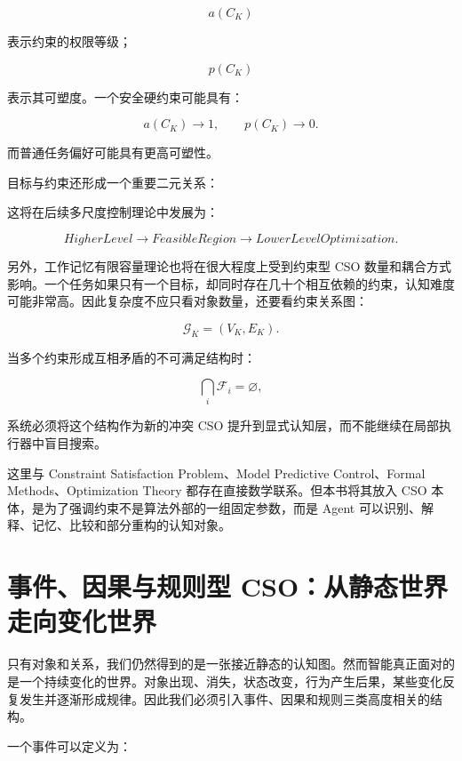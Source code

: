 \[
a(C_K)
\]

表示约束的权限等级；

\[
p(C_K)
\]

表示其可塑度。一个安全硬约束可能具有：

\[
a(C_K)\rightarrow 1,
\qquad
p(C_K)\rightarrow0.
\]

而普通任务偏好可能具有更高可塑性。

目标与约束还形成一个重要二元关系：

\begin{statementbox}
\centering
{}
\end{statementbox}

这将在后续多尺度控制理论中发展为：

\[
HigherLevel
\rightarrow
FeasibleRegion
\rightarrow
LowerLevelOptimization.
\]

另外，工作记忆有限容量理论也将在很大程度上受到约束型 CSO 数量和耦合方式影响。一个任务如果只有一个目标，却同时存在几十个相互依赖的约束，认知难度可能非常高。因此复杂度不应只看对象数量，还要看约束关系图：

\[
\mathcal G_K
=
(V_K,E_K).
\]

当多个约束形成互相矛盾的不可满足结构时：

\[
\bigcap_i \mathcal F_i
=
\varnothing,
\]

系统必须将这个结构作为新的冲突 CSO 提升到显式认知层，而不能继续在局部执行器中盲目搜索。

这里与 Constraint Satisfaction Problem、Model Predictive Control、Formal Methods、Optimization Theory 都存在直接数学联系。但本书将其放入 CSO 本体，是为了强调约束不是算法外部的一组固定参数，而是 Agent 可以识别、解释、记忆、比较和部分重构的认知对象。


\section{事件、因果与规则型 CSO：从静态世界走向变化世界}

只有对象和关系，我们仍然得到的是一张接近静态的认知图。然而智能真正面对的是一个持续变化的世界。对象出现、消失，状态改变，行为产生后果，某些变化反复发生并逐渐形成规律。因此我们必须引入事件、因果和规则三类高度相关的结构。

一个事件可以定义为：

\begin{statementbox}
\centering
{}
\end{statementbox}

